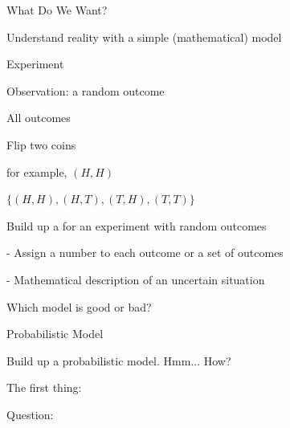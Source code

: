 \documentclass[fleqn,aspectratio=169]{beamer}
\begin{document}
\begin{frame}{What Do We Want?}


\hspace{-0.2in} Understand reality with a simple (mathematical) model


{
\bci [$\circ$] 
\item<1-> Experiment

\item<2-> Observation: a random outcome

\item<3-> All outcomes
\eci 
}
{
\bci [$\circ$] 
\item<1-> Flip two coins

\item<2-> for example, $(H,H)$

\item<3-> $\{ (H,H), (H,T), (T,H), (T,T) \}$

\eci 
}
\separator

\bci

\item<4->  Build up a  for an experiment with random outcomes


\item<6->  

- Assign a number to each outcome or a set of outcomes

- Mathematical description of an uncertain situation

\item<7-> Which model is good or bad?

\eci
\end{frame}

\begin{frame}{Probabilistic Model}

 Build up a probabilistic model. Hmm... How?

The first thing: 

\bigskip

\bigskip

\alert{Question:} 

\end{frame}
\end{document}
